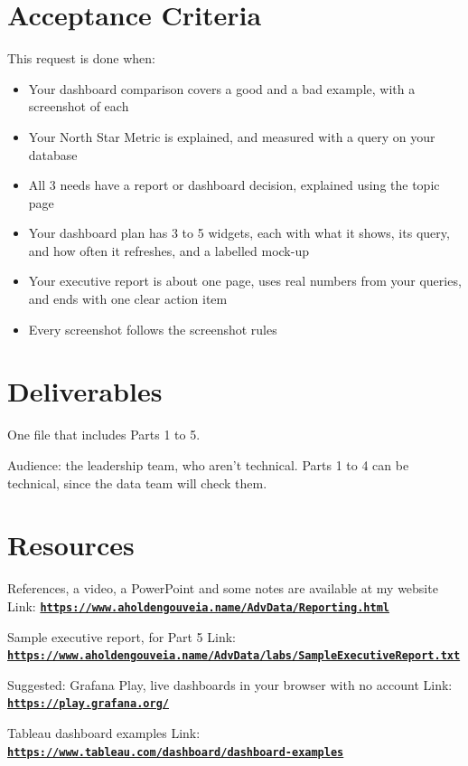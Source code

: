 \documentclass[12pt]{article}
\begin{document}
\section*{Acceptance Criteria}
This request is done when:
\begin{itemize}
    \item Your dashboard comparison covers a good and a bad example, with a screenshot of each
    \item Your North Star Metric is explained, and measured with a query on your database
    \item All 3 needs have a report or dashboard decision, explained using the topic page
    \item Your dashboard plan has 3 to 5 widgets, each with what it shows, its query, and how often it refreshes, and a labelled mock-up
    \item Your executive report is about one page, uses real numbers from your queries, and ends with one clear action item
    \item Every screenshot follows the screenshot rules
\end{itemize}

\section*{Deliverables}
One file that includes Parts 1 to 5.

Audience: the leadership team, who aren't technical. Parts 1 to 4 can be technical, since the data team will check them.

\section*{Resources}
References, a video, a PowerPoint and some notes are available at my website
Link: \href{https://www.aholdengouveia.name/AdvData/Reporting.html}{\textbf{\nolinkurl{https://www.aholdengouveia.name/AdvData/Reporting.html}}}

Sample executive report, for Part 5
Link: \href{https://www.aholdengouveia.name/AdvData/labs/SampleExecutiveReport.txt}{\textbf{\nolinkurl{https://www.aholdengouveia.name/AdvData/labs/SampleExecutiveReport.txt}}}

Suggested: Grafana Play, live dashboards in your browser with no account
Link: \href{https://play.grafana.org/}{\textbf{\nolinkurl{https://play.grafana.org/}}}

Tableau dashboard examples
Link: \href{https://www.tableau.com/dashboard/dashboard-examples}{\textbf{\nolinkurl{https://www.tableau.com/dashboard/dashboard-examples}}}
\end{document}
